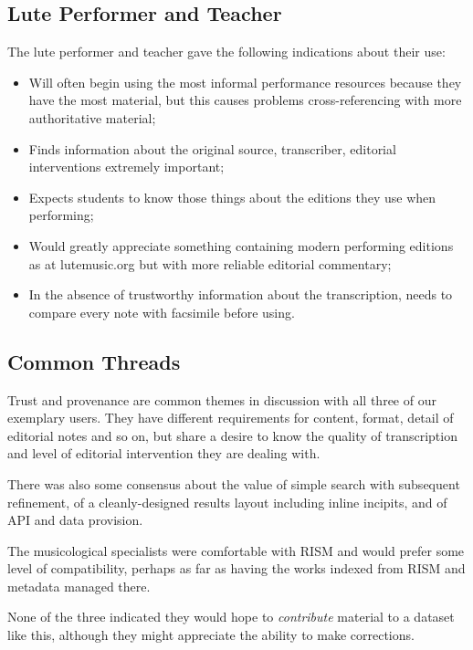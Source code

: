\documentclass[sigconf, nonacm=true]{acmart}
\begin{document}
\begin{sloppypar}
  \subsection{Lute Performer and Teacher}

  The lute performer and teacher gave the following indications about
  their use:

  \begin{itemize}
    \item Will often begin using the most informal performance
      resources because they have the most material, but this causes
      problems cross-referencing with more authoritative material;
    \item Finds information about the original source, transcriber,
      editorial interventions extremely important;
    \item Expects students to know those things about the editions
      they use when performing;
    \item Would greatly appreciate something containing modern
      performing editions as at lutemusic.org but with more reliable
      editorial commentary;
    \item In the absence of trustworthy information about the
      transcription, needs to compare every note with facsimile before
      using.
  \end{itemize}

  \subsection{Common Threads}

  Trust and provenance are common themes in discussion with all three
  of our exemplary users. They have different requirements for
  content, format, detail of editorial notes and so on, but share a
  desire to know the quality of transcription and level of editorial
  intervention they are dealing with.

  There was also some consensus about the value of simple search with
  subsequent refinement, of a cleanly-designed results layout
  including inline incipits, and of API and data provision.
  
  The musicological specialists were comfortable with RISM and would
  prefer some level of compatibility, perhaps as far as having the
  works indexed from RISM and metadata managed there.

  None of the three indicated they would hope to {\em contribute}
  material to a dataset like this, although they might appreciate the
  ability to make corrections.
  

\end{sloppypar}
\end{document}

